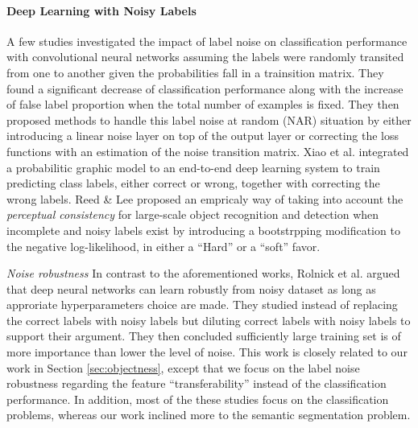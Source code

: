 \paragraph{{Deep Learning with Noisy Labels}}
A few studies\cite{sukhbaatar2014training,patrini2016making} investigated the impact of label noise on classification performance with convolutional neural networks assuming the labels were randomly transited from one to another given the probabilities fall in a trainsition matrix.
They found a significant decrease of classification performance along with the increase of false label proportion when the total number of examples is fixed.
They then proposed methods to handle this label noise at random (NAR)\cite{frenay2014classification} situation by either introducing a linear noise layer on top of the output layer\cite{sukhbaatar2014training} or correcting the loss functions with an estimation of the noise transition matrix\cite{patrini2016making}.
Xiao et al.\cite{xiao2015learning} integrated a probabilitic graphic model to an end-to-end deep learning system to train predicting class labels, either correct or wrong, together with correcting the wrong labels.
Reed \& Lee\cite{reed2014training} proposed an empricaly way of taking into account the \textit{perceptual consistency} for large-scale object recognition and detection when incomplete and noisy labels exist by introducing a bootstrpping modification to the negative log-likelihood, in either a ``Hard'' or a ``soft'' favor.

\textit{Noise robustness}
In contrast to the aforementioned works, Rolnick et al.\cite{rolnick2017deep} argued that deep neural networks can learn robustly from noisy dataset as long as approriate hyperparameters choice are made.
They studied instead of replacing the correct labels with noisy labels but diluting correct labels with noisy labels to support their argument.
They then concluded sufficiently large training set is of more importance than lower the level of noise.
This work is closely related to our work in Section \ref{sec:objectness}, except that we focus on the label noise robustness regarding the feature ``transferability'' instead of the classification performance.
In addition, most of the these studies focus on the classification problems, whereas our work inclined more to the semantic segmentation problem.

